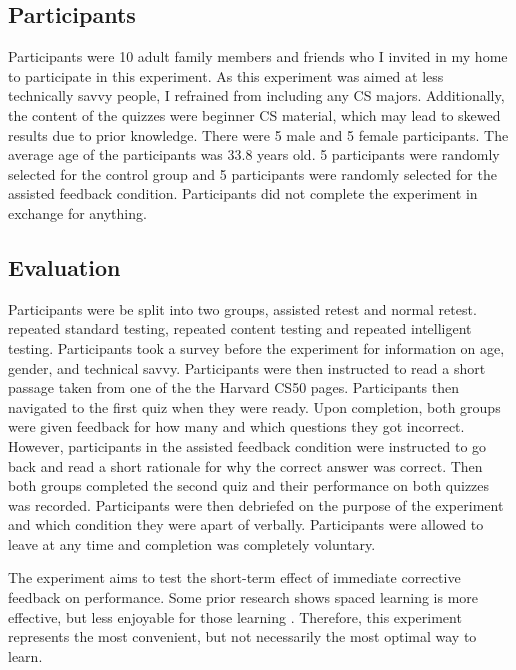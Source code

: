 \documentclass[acmtog]{acmart}
\begin{document}
\subsection{Participants}
Participants were 10 adult family members and friends who I invited in my home to participate in this experiment. As this experiment was aimed at less technically savvy people, I refrained from including any CS majors. Additionally, the content of the quizzes were beginner CS material, which may lead to skewed results due to prior knowledge. There were 5 male and 5 female participants. The average age of the participants was 33.8 years old. 5 participants were randomly selected for the control group and 5 participants were randomly selected for the assisted feedback condition. Participants did not complete the experiment in exchange for anything.

\subsection{Evaluation}
Participants were be split into two groups, assisted retest and normal retest. repeated standard testing, repeated content testing and repeated intelligent testing. Participants took a survey before the experiment for information on age, gender, and technical savvy. Participants were then instructed to read a short passage taken from one of the the Harvard CS50 pages. Participants then navigated to the first quiz when they were ready. Upon completion, both groups were given feedback for how many and which questions they got incorrect. However, participants in the assisted feedback condition were instructed to go back and read a short rationale for why the correct answer was correct. Then both groups completed the second quiz and their performance on both quizzes was recorded. Participants were then debriefed on the purpose of the experiment and which condition they were apart of verbally. Participants were allowed to leave at any time and completion was completely voluntary.

The experiment aims to test the short-term effect of immediate corrective feedback on performance. Some prior research shows spaced learning is more effective, but less enjoyable for those learning \cite{su2021levels}. Therefore, this experiment represents the most convenient, but not necessarily the most optimal way to learn.
\end{document}
